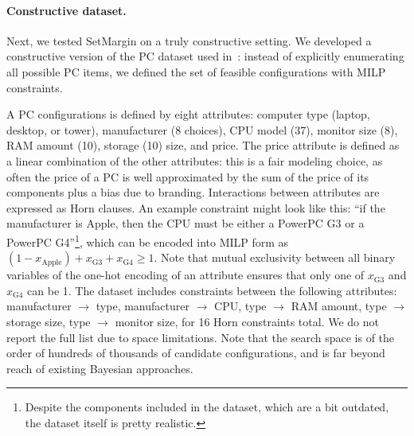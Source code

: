 \documentclass{article}
\renewcommand\[{\begin{equation}}
\renewcommand\]{\end{equation}}
\newcommand{\paolo}[1]{{\bf \textcolor{red}{{\fbox{Paolo:} #1}}}}
\begin{document}


\paragraph{Constructive dataset.} Next, we tested {\sc SetMargin} on a truly
constructive setting. We developed a constructive version of the PC dataset
used in~\cite{guo2010real}: instead of explicitly enumerating all possible PC
items, we defined the set of feasible configurations with MILP constraints.

A PC configurations is defined by eight attributes: computer type (laptop,
desktop, or tower), manufacturer (8 choices), CPU model (37), monitor size (8), RAM amount (10), storage (10)
size, and price.
The price attribute is defined as a linear combination of the other
attributes: this is a fair modeling choice, as often the price of a PC is
well approximated by the sum of the price of its components plus a bias due to
branding.
%
Interactions between attributes are expressed as Horn clauses. An example
constraint might look like this: ``if the manufacturer is Apple, then the
CPU must be either a PowerPC G3 or a PowerPC G4''\footnote{Despite the components
included in the dataset, which are a bit outdated, the dataset itself is pretty
realistic.}, which can be encoded
into MILP form as
%
$ (1 - x_\text{Apple}) + x_\text{G3} + x_\text{G4} \ge 1 $.
%
Note that mutual exclusivity between all binary variables of the
one-hot encoding of an attribute ensures that only one of
$x_\text{G3}$ and $x_\text{G4}$ can be 1.  The dataset includes
constraints between the following attributes: manufacturer $\to$ type,
manufacturer $\to$ CPU, type $\to$ RAM amount, type $\to$ storage
size, type $\to$ monitor size, for 16 Horn constraints total. We do
not report the full list due to space limitations. Note that the
search space is of the order of hundreds of thousands of candidate
configurations, and is far beyond reach of existing Bayesian
approaches.
\end{document}
